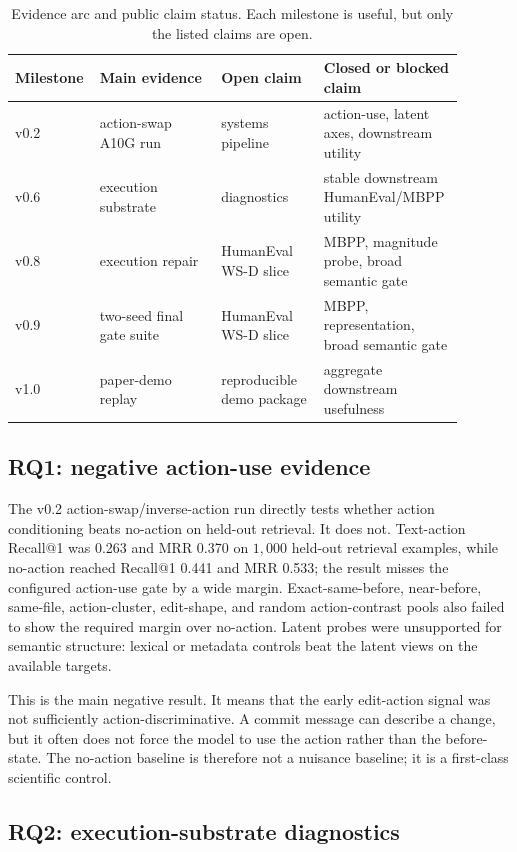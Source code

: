 \documentclass[11pt]{article}
\begin{document}
\begin{table}[t]
\centering
\caption{Evidence arc and public claim status. Each milestone is useful, but
only the listed claims are open.}
\label{tab:arc}
\small
\begin{tabular}{L{0.12\linewidth}L{0.26\linewidth}L{0.22\linewidth}L{0.29\linewidth}}
\toprule
Milestone & Main evidence & Open claim & Closed or blocked claim \\
\midrule
v0.2 & action-swap A10G run & systems pipeline & action-use, latent axes, downstream utility \\
v0.6 & execution substrate & diagnostics & stable downstream HumanEval/MBPP utility \\
v0.8 & execution repair & HumanEval WS-D slice & MBPP, magnitude probe, broad semantic gate \\
v0.9 & two-seed final gate suite & HumanEval WS-D slice & MBPP, representation, broad semantic gate \\
v1.0 & paper-demo replay & reproducible demo package & aggregate downstream usefulness \\
\bottomrule
\end{tabular}
\end{table}

\subsection{RQ1: negative action-use evidence}

The v0.2 action-swap/inverse-action run directly tests whether action
conditioning beats no-action on held-out retrieval. It does not. Text-action
Recall@1 was 0.263 and MRR 0.370 on $1{,}000$ held-out retrieval examples, while
no-action reached Recall@1 0.441 and MRR 0.533; the result misses the configured
action-use gate by a wide margin. Exact-same-before, near-before, same-file,
action-cluster, edit-shape, and random action-contrast pools also failed to
show the required margin over no-action. Latent probes were unsupported for
semantic structure: lexical or metadata controls beat the latent views on the
available targets.

This is the main negative result. It means that the early edit-action signal
was not sufficiently action-discriminative. A commit message can describe a
change, but it often does not force the model to use the action rather than the
before-state. The no-action baseline is therefore not a nuisance baseline; it
is a first-class scientific control.

\subsection{RQ2: execution-substrate diagnostics}
\end{document}
